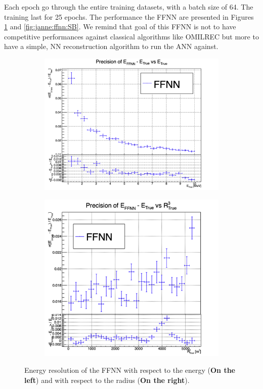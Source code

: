 \documentclass[../main.tex]{subfiles}
\begin{document}
Each epoch go through the entire training datasets, with a batch size of 64. The training last for 25 epochs. The performance the FFNN are presented in Figures \ref{fig:janne:ffnn:ESB} and \ref{fig:janne:ffnn:SB}. We remind that goal of this FFNN is not to have competitive performances against classical algorithms like OMILREC but more to have a simple, NN reconstruction algorithm to run the ANN against.

\begin{figure}[ht]
  \centering
  \begin{subfigure}[t]{0.48\linewidth}
    \includegraphics[width=\linewidth]{images/janne/ffnn/ESBE.png}
  \end{subfigure}
  \hfill
  \begin{subfigure}[t]{0.48\linewidth}
    \includegraphics[width=\linewidth]{images/janne/ffnn/ESBR.png}
  \end{subfigure}
  \caption{Energy resolution of the FFNN with respect to the energy (\textbf{On the left}) and with respect to the radius (\textbf{On the right}).}
  \label{fig:janne:ffnn:ESB}
\end{figure}
\end{document}
